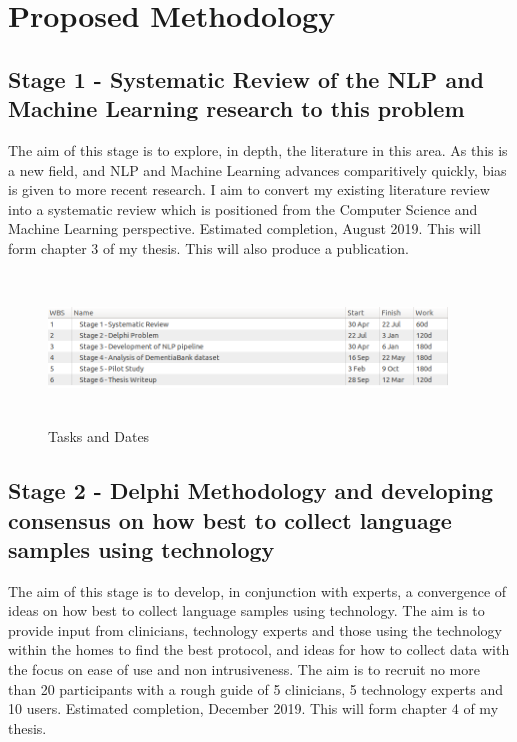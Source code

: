 \documentclass[11pt]{article}
\begin{document}
\section*{Proposed Methodology}
\subsection*{Stage 1 - Systematic Review of the NLP and Machine Learning research to this problem}
The aim of this stage is to explore, in depth, the literature in this area. As this is a new field, and NLP and Machine Learning advances comparitively quickly, bias is given to more recent research. I aim to convert my existing literature review into a systematic review which is positioned from the Computer Science and Machine Learning perspective. Estimated completion, August 2019. This will form chapter 3 of my thesis. This will also produce a publication.

\begin{figure}[H]
\centering
\includegraphics[width=400px, height=150px]{images/TasksAndDates.png}
\caption{Tasks and Dates}
\end{figure}

\subsection*{Stage 2 - Delphi Methodology and developing consensus on how best to collect language samples using technology}
The aim of this stage is to develop, in conjunction with experts, a convergence of ideas on how best to collect language samples using technology. The aim is to provide input from clinicians, technology experts and those using the technology within the homes to find the best protocol, and ideas for how to collect data with the focus on ease of use and non intrusiveness. The aim is to recruit no more than 20 participants with a rough guide of 5 clinicians, 5 technology experts and 10 users. Estimated completion, December 2019. This will form chapter 4 of my thesis.
\end{document}
